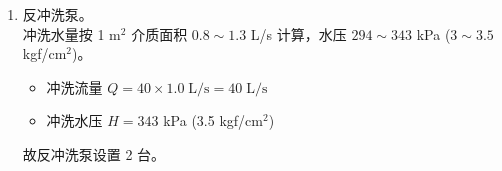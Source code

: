 \begin{enumerate}
\begin{enumerate}[label=(\arabic*)]
        \item 反冲洗泵。\\
        冲洗水量按 1 m$^2$ 介质面积 $0.8\sim 1.3$ L/s 计算，水压 $294\sim 343$ kPa ($3\sim 3.5$ kgf/cm$^2$)。
		\begin{itemize}
			\item 冲洗流量 $Q=40 \times 1.0 \;\text{L/s} =40 \;\text{L/s}$
			\item 冲洗水压 $H=343$ kPa (3.5 kgf/cm$^2$)
		\end{itemize}
        故反冲洗泵设置 2 台。
    \end{enumerate}
\end{enumerate}

